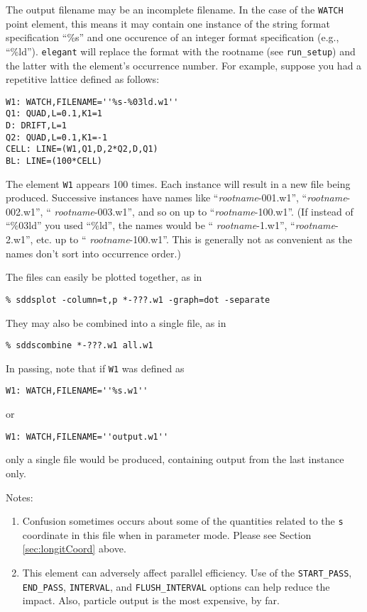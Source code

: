 The output filename may be an incomplete filename.  In the case of the
\verb|WATCH| point element, this means it may contain one instance of
the string format specification ``\%s'' and one occurence of an
integer format specification (e.g., ``\%ld'').  {\tt elegant} will
replace the format with the rootname (see
\verb|run_setup|) and the latter with the element's occurrence
number.  For example, suppose you had a repetitive lattice defined as
follows:
\begin{verbatim}
W1: WATCH,FILENAME=''%s-%03ld.w1''
Q1: QUAD,L=0.1,K1=1
D: DRIFT,L=1
Q2: QUAD,L=0.1,K1=-1
CELL: LINE=(W1,Q1,D,2*Q2,D,Q1)
BL: LINE=(100*CELL)
\end{verbatim}
The element \verb|W1| appears 100 times.  Each instance will result in
a new file being produced.  Successive instances have names like
``{\em rootname}-001.w1'', ``{\em rootname}-002.w1'', ``{\em
rootname}-003.w1'', and so on up to ``{\em rootname}-100.w1''.  (If
instead of ``\%03ld'' you used ``\%ld'', the names would be ``{\em
rootname}-1.w1'', ``{\em rootname}-2.w1'', etc. up to ``{\em
rootname}-100.w1''.  This is generally not as convenient as the names
don't sort into occurrence order.)

The files can easily be plotted together, as in 
\begin{verbatim}
% sddsplot -column=t,p *-???.w1 -graph=dot -separate 
\end{verbatim}
They may also be combined into a single file, as in
\begin{verbatim}
% sddscombine *-???.w1 all.w1 
\end{verbatim}

In passing, note that if \verb|W1| was defined as
\begin{verbatim}
W1: WATCH,FILENAME=''%s.w1''
\end{verbatim}
or 
\begin{verbatim}
W1: WATCH,FILENAME=''output.w1''
\end{verbatim}
only a single file would be produced, containing output from the last instance
only.

Notes: 
\begin{enumerate}
\item Confusion sometimes occurs about some of the quantities related
  to the {\tt s} coordinate in this file when in parameter mode.  Please
  see Section \ref{sec:longitCoord} above.
\item This element can adversely affect parallel efficiency. Use of the
  \verb|START_PASS|, \verb|END_PASS|, \verb|INTERVAL|,  and \verb|FLUSH_INTERVAL|
  options can help reduce the impact. Also, particle output is the most expensive, by far.
\end{enumerate}
